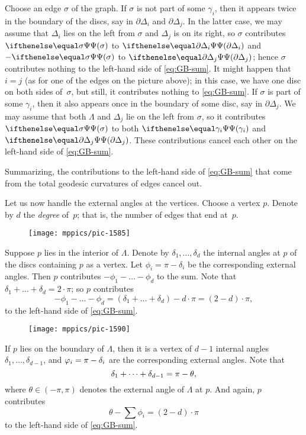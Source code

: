 Choose an edge $\sigma$ of the graph.
If $\sigma$ is not part of some $\gamma_i$,
then it appears twice in the boundary of the discs, say in  $\partial \Delta_i$ and $ \partial \Delta_j$. 
In the latter case, we may assume that $\Delta_i$ lies on the left from $\sigma$ and $\Delta_j$ is on its right, so 
 $\sigma$ contributes $\tgc\sigma$ to $\tgc{\partial\Delta_i}$ and $-\tgc\sigma$ to $\tgc{\partial\Delta_j}$; hence $\sigma$ contributes nothing to the left-hand side of \ref{eq:GB-sum}.
It might happen that $i=j$ (as for one of the edges on the picture above);
in this case, we have one disc on both sides of~$\sigma$, but still, it contributes nothing to \ref{eq:GB-sum}.
If $\sigma$ is part of some $\gamma_i$, then it also appears once in the boundary of some disc, say in $\partial \Delta_j$.
We may assume that both $\Lambda$ and $\Delta_j$ lie on the left from $\sigma$,
so it contributes $\tgc\sigma$ to both $\tgc{\gamma_i}$ and $\tgc{\partial\Delta_j}$.
These contributions cancel each other on the left-hand side of  \ref{eq:GB-sum}.

Summarizing, the contributions to the left-hand side of  \ref{eq:GB-sum} that come from the total geodesic curvatures of edges cancel out.

Let us now handle the external angles at the vertices.
Choose a vertex $p$.
Denote by $d$ the \emph{degree} of~$p$;
that is, the number of edges that end at~$p$.

\begin{wrapfigure}{r}{23 mm}
\vskip-6mm
\centering
\texttt{[image: mppics/pic-1585]}
\end{wrapfigure}

Suppose $p$ lies in the interior of $\Lambda$.
Denote by $\delta_1,\dots,\delta_d$ the internal angles at $p$ of the discs containing $p$ as a vertex. 
Let  $\phi_{i}=\pi-\delta_{i}$ be the corresponding external angles.
Then $p$ contributes  
$-\phi_1-\dots-\phi_d$ to the sum.
Note that $\delta_1+\dots+\delta_d=2\cdot\pi$;
so $p$ contributes
\[-\phi_1-\dots-\phi_d = (\delta_1+\dots+\delta_d) - d\cdot \pi=(2-d)\cdot \pi,\]
to the left-hand side of \ref{eq:GB-sum}.

\begin{wrapfigure}{r}{23 mm}
\vskip-0mm
\centering
\texttt{[image: mppics/pic-1590]}
\end{wrapfigure}

If $p$ lies on the boundary of $\Lambda$, then it is a vertex of $d-1$ internal angles
$\delta_1,\dots,\delta_{d-1}$, and $\phi_{i}\z=\pi-\delta_{i}$ are the corresponding external angles.
Note that
\[\delta_1+\dots+\delta_{d-1}\z=\pi-\theta,\]
where $\theta\in(-\pi,\pi)$ denotes the external angle of $\Lambda$ at $p$.
And again, $p$ contributes
\[\theta-\sum\phi_{i}=(2-d)\cdot \pi\]
to the left-hand side of \ref{eq:GB-sum}.

